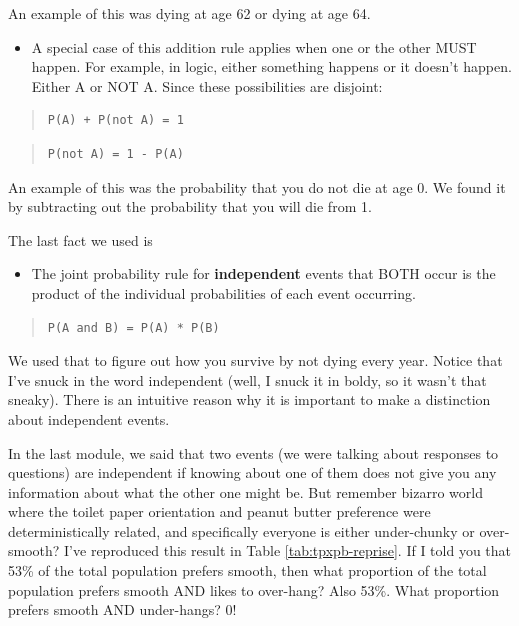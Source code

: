 \documentclass[openany]{book}
\providecommand{\tightlist}{%
  \setlength{\itemsep}{0pt}\setlength{\parskip}{0pt}}
\begin{document}
An example of this was dying at age 62 or dying at age 64.

\begin{itemize}
\tightlist
\item
  A special case of this addition rule applies when one or the other MUST happen. For example, in logic, either something happens or it doesn't happen. Either A or NOT A. Since these possibilities are disjoint:
\end{itemize}

\begin{quote}
\begin{verbatim}
P(A) + P(not A) = 1
\end{verbatim}
\end{quote}

\begin{quote}
\begin{verbatim}
P(not A) = 1 - P(A)
\end{verbatim}
\end{quote}

An example of this was the probability that you do not die at age 0. We found it by subtracting out the probability that you will die from 1.

The last fact we used is

\begin{itemize}
\tightlist
\item
  The joint probability rule for \textbf{independent} events that BOTH occur is the product of the individual probabilities of each event occurring.
\end{itemize}

\begin{quote}
\begin{verbatim}
P(A and B) = P(A) * P(B)
\end{verbatim}
\end{quote}

We used that to figure out how you survive by not dying every year. Notice that I've snuck in the word independent (well, I snuck it in boldy, so it wasn't that sneaky). There is an intuitive reason why it is important to make a distinction about independent events.

In the last module, we said that two events (we were talking about responses to questions) are independent if knowing about one of them does not give you any information about what the other one might be. But remember bizarro world where the toilet paper orientation and peanut butter preference were deterministically related, and specifically everyone is either under-chunky or over-smooth? I've reproduced this result in Table \ref{tab:tpxpb-reprise}. If I told you that 53\% of the total population prefers smooth, then what proportion of the total population prefers smooth AND likes to over-hang? Also 53\%. What proportion prefers smooth AND under-hangs? 0!
\end{document}

